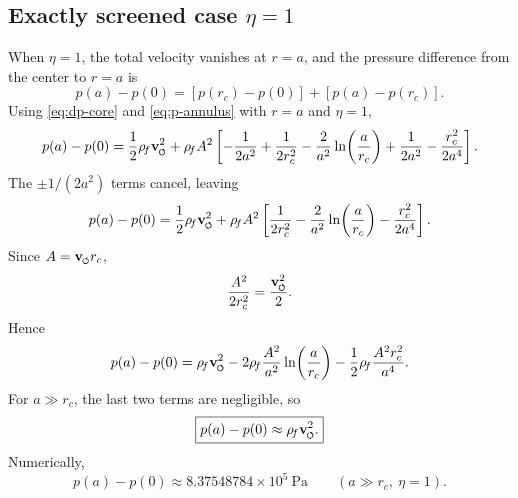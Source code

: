 \documentclass[11pt]{article}
\newcommand{\swirlarrow}{\mathchoice{\mkern-2mu\scriptstyle\boldsymbol{\circlearrowleft}}{\mkern-2mu\scriptstyle\boldsymbol{\circlearrowleft}}{\mkern-2mu\scriptscriptstyle\boldsymbol{\circlearrowleft}}{\mkern-2mu\scriptscriptstyle\boldsymbol{\circlearrowleft}}}
\newcommand{\vswirl}{\mathbf{v}_{\swirlarrow}}
\newcommand{\rhoF}{\rho_{\!f}}
\newcommand{\rc}{r_c}
\begin{document}
        \subsection{Exactly screened case \(\eta=1\)}
            
            When \(\eta=1\), the total velocity vanishes at \(r=a\), and the pressure difference from the center to \(r=a\) is
            \begin{equation}
                p(a)-p(0)
                =
                [p(\rc)-p(0)] + [p(a)-p(\rc)].
                \label{eq:p-total-a}
            \end{equation}
            Using \eqref{eq:dp-core} and \eqref{eq:p-annulus} with \(r=a\) and \(\eta=1\),
            \begin{equation}
                p(a)-p(0)
                =
                \frac{1}{2}\rhoF \vswirl^2
                +
                \rhoF A^2
                \left[
                    -\frac{1}{2a^2}+\frac{1}{2\rc^2}
                    -\frac{2}{a^2}\ln\!\left(\frac{a}{\rc}\right)
                    +\frac{1}{2a^2}-\frac{\rc^2}{2a^4}
                \right].
            \end{equation}
            The \(\pm 1/(2a^2)\) terms cancel, leaving
            \begin{equation}
                p(a)-p(0)
                =
                \frac{1}{2}\rhoF \vswirl^2
                +
                \rhoF A^2
                \left[
                    \frac{1}{2\rc^2}
                    -\frac{2}{a^2}\ln\!\left(\frac{a}{\rc}\right)
                    -\frac{\rc^2}{2a^4}
                \right].
                \label{eq:p-total-a-expanded}
            \end{equation}
            Since \(A=\vswirl \rc\),
            \[
                \frac{A^2}{2\rc^2} = \frac{\vswirl^2}{2}.
            \]
            Hence
            \begin{equation}
                p(a)-p(0)
                =
                \rhoF \vswirl^2
                -
                2\rhoF \frac{A^2}{a^2}\ln\!\left(\frac{a}{\rc}\right)
                -
                \frac{1}{2}\rhoF \frac{A^2 \rc^2}{a^4}.
                \label{eq:p-total-a-nearly}
            \end{equation}
            For \(a\gg \rc\), the last two terms are negligible, so
            \begin{equation}
                \boxed{
                    p(a)-p(0)\approx \rhoF \vswirl^2.
                }
                \label{eq:p-total-a-asymptotic}
            \end{equation}
            Numerically,
            \begin{equation}
                p(a)-p(0)
                \approx
                8.37548784\times 10^5\ \mathrm{Pa}
                \qquad
                (a\gg \rc,\ \eta=1).
                \label{eq:p-total-a-numeric}
            \end{equation}
        
\end{document}
